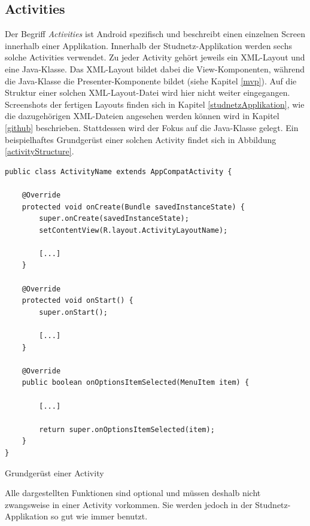 \documentclass[../main.tex]{subfiles}
\begin{document}
	\subsection{Activities} \label{activities}
	Der Begriff \emph{Activities} ist Android spezifisch und beschreibt einen einzelnen Screen innerhalb einer Applikation. Innerhalb der Studnetz-Applikation werden sechs solche Activities verwendet. Zu jeder Activity gehört jeweils ein XML-Layout und eine Java-Klasse. Das XML-Layout bildet dabei die View-Komponenten, während die Java-Klasse die Presenter-Komponente bildet (siehe Kapitel \ref{mvp}). Auf die Struktur einer solchen XML-Layout-Datei wird hier nicht weiter eingegangen. Screenshots der fertigen Layouts finden sich in Kapitel \ref{studnetzApplikation}, wie die dazugehörigen XML-Dateien angesehen werden können wird in Kapitel \ref{github} beschrieben. Stattdessen wird der Fokus auf die Java-Klasse gelegt. Ein beispielhaftes Grundgerüst einer solchen Activity findet sich in Abbildung \ref{activityStructure}.
	
\begin{code}
	\begin{center}
		\begin{verbatim}
public class ActivityName extends AppCompatActivity {
			
	@Override
	protected void onCreate(Bundle savedInstanceState) {
		super.onCreate(savedInstanceState);
		setContentView(R.layout.ActivityLayoutName);
		
		[...]	
	}
	
	@Override
	protected void onStart() {
		super.onStart();
		
		[...]
	}
	
	@Override
	public boolean onOptionsItemSelected(MenuItem item) {
		
		[...]
		
		return super.onOptionsItemSelected(item);
	}
}	
		\end{verbatim}
		\caption{Grundgerüst einer Activity}
		\label{activityStructure}
	\end{center}
	
\end{code}

	Alle dargestellten Funktionen sind optional und müssen deshalb nicht zwangsweise in einer Activity vorkommen. Sie werden jedoch in der Studnetz-Applikation so gut wie immer benutzt.
\end{document}
